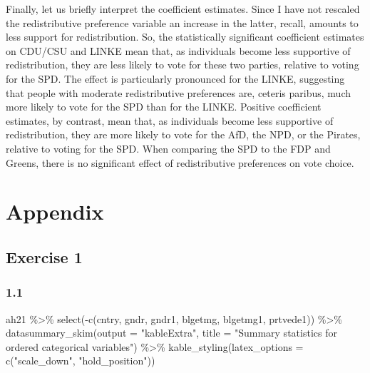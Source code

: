 \documentclass[
]{article}
\newenvironment{Shaded}{\begin{snugshade}}{\end{snugshade}}
\newcommand{\AttributeTok}[1]{\textcolor[rgb]{0.77,0.63,0.00}{#1}}
\newcommand{\FunctionTok}[1]{\textcolor[rgb]{0.00,0.00,0.00}{#1}}
\newcommand{\NormalTok}[1]{#1}
\newcommand{\SpecialCharTok}[1]{\textcolor[rgb]{0.00,0.00,0.00}{#1}}
\newcommand{\StringTok}[1]{\textcolor[rgb]{0.31,0.60,0.02}{#1}}
\begin{document}
Finally, let us briefly interpret the coefficient estimates. Since I
have not rescaled the redistributive preference variable an increase in
the latter, recall, amounts to less support for redistribution. So, the
statistically significant coefficient estimates on CDU/CSU and LINKE
mean that, as individuals become less supportive of redistribution, they
are less likely to vote for these two parties, relative to voting for
the SPD. The effect is particularly pronounced for the LINKE, suggesting
that people with moderate redistributive preferences are, ceteris
paribus, much more likely to vote for the SPD than for the LINKE.
Positive coefficient estimates, by contrast, mean that, as individuals
become less supportive of redistribution, they are more likely to vote
for the AfD, the NPD, or the Pirates, relative to voting for the SPD.
When comparing the SPD to the FDP and Greens, there is no significant
effect of redistributive preferences on vote choice.

\hypertarget{appendix}{%
\section{Appendix}\label{appendix}}

\hypertarget{exercise-1-1}{%
\subsection{Exercise 1}\label{exercise-1-1}}

\hypertarget{section-7}{%
\subsubsection{1.1}\label{section-7}}

\begin{Shaded}
\begin{Highlighting}[]
\NormalTok{ah21 }\SpecialCharTok{\%\textgreater{}\%}
  \FunctionTok{select}\NormalTok{(}\SpecialCharTok{{-}}\FunctionTok{c}\NormalTok{(cntry, gndr, gndr1, blgetmg, blgetmg1, prtvede1)) }\SpecialCharTok{\%\textgreater{}\%}
  \FunctionTok{datasummary\_skim}\NormalTok{(}\AttributeTok{output =} \StringTok{"kableExtra"}\NormalTok{, }
                   \AttributeTok{title =} \StringTok{"Summary statistics for ordered categorical variables"}\NormalTok{) }\SpecialCharTok{\%\textgreater{}\%}
  \FunctionTok{kable\_styling}\NormalTok{(}\AttributeTok{latex\_options =} \FunctionTok{c}\NormalTok{(}\StringTok{"scale\_down"}\NormalTok{, }\StringTok{"hold\_position"}\NormalTok{))}
\end{Highlighting}
\end{Shaded}
\end{document}
